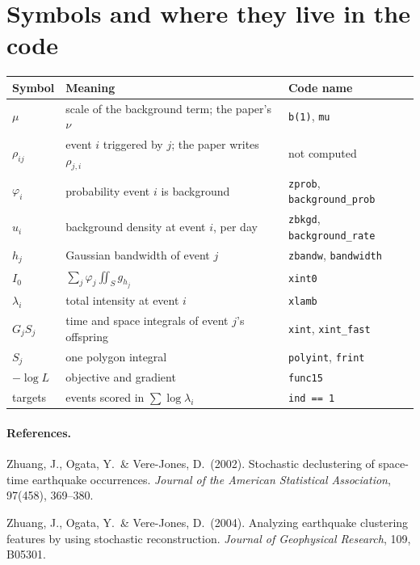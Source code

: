 \documentclass[11pt,a4paper]{article}
\newcommand{\code}[1]{\texttt{#1}}
\begin{document}
\section{Symbols and where they live in the code}
\begin{table}[H]
\centering\small
\begin{tabular}{@{}lll@{}}
\toprule
Symbol & Meaning & Code name \\
\midrule
$\mu$ & scale of the background term; the paper's $\nu$ & \code{b(1)}, \code{mu} \\
$\rho_{ij}$ & event $i$ triggered by $j$; the paper writes $\rho_{j,i}$ & not computed \\
$\varphi_i$ & probability event $i$ is background & \code{zprob}, \code{background\_prob} \\
$u_i$ & background density at event $i$, per day & \code{zbkgd}, \code{background\_rate} \\
$h_j$ & Gaussian bandwidth of event $j$ & \code{zbandw}, \code{bandwidth} \\
$I_0$ & $\sum_j\varphi_j\iint_S g_{h_j}$ & \code{xint0} \\
$\lambda_i$ & total intensity at event $i$ & \code{xlamb} \\
$G_jS_j$ & time and space integrals of event $j$'s offspring & \code{xint}, \code{xint\_fast} \\
$S_j$ & one polygon integral & \code{polyint}, \code{frint} \\
$-\log L$ & objective and gradient & \code{func15} \\
targets & events scored in $\sum\log\lambda_i$ & \code{ind == 1} \\
\bottomrule
\end{tabular}
\end{table}

\paragraph{References.} Zhuang, J., Ogata, Y.\ \& Vere-Jones, D.\ (2002). Stochastic declustering of
space-time earthquake occurrences. \emph{Journal of the American Statistical Association}, 97(458), 369--380.

Zhuang, J., Ogata, Y.\ \& Vere-Jones, D.\ (2004). Analyzing earthquake clustering features by using
stochastic reconstruction. \emph{Journal of Geophysical Research}, 109, B05301.
\end{document}
